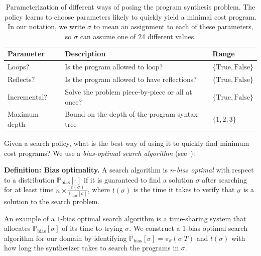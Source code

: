 \documentclass{article}
\newcommand{\probability}{\mathds{P}} %
\begin{document}
\begin{table}[h]\centering
  \caption{Parameterization of different ways of posing the program synthesis problem. The policy learns to choose parameters likely to quickly yield a minimal cost program. In our notation, we write $\sigma $ to mean an assignment to each of these parameters, so $\sigma $ can assume one of 24 different values.}\label{policyOutput}
  \begin{tabular}{lll}\toprule
  Parameter&Description&Range\\\midrule
  Loops?&Is the program allowed to loop?&$\{\text{True},\text{False}\}$\\
  Reflects?&Is the program allowed to have reflections?&$\{\text{True},\text{False}\}$\\
  Incremental?&Solve the problem piece-by-piece or all at once?&$\{\text{True},\text{False}\}$\\
  Maximum depth& Bound on the depth of the program syntax tree&$\{1,2,3\}$
  \\\bottomrule
  \end{tabular}
  \end{table}


Given a search policy, what is the best way of using it to quickly find minimum cost programs?
We use a \emph{bias-optimal search algorithm} (see~\cite{schmidhuber2004optimal}):

\textbf{Definition: Bias optimality.} A search algorithm is $n$-\emph{bias optimal}
with respect to a distribution $\probability_{\text{bias}}[\cdot ]$ if it is
guaranteed to find a solution $\sigma $ after searching for at least time
$n\times\frac{t(\sigma )}{\probability_{\text{bias}}[\sigma ]}$, where $t(\sigma )$ is the time it
takes to verify that $\sigma $ is a solution to the
search problem.

An example of a $1$-bias optimal search algorithm is a time-sharing system
that allocates $\probability_{\text{bias}}[\sigma ]$ of its time to trying $\sigma $.
We construct a $1$-bias optimal search algorithm for our domain by
identifying $\probability_{\text{bias}}[\sigma ] = \pi_\theta(\sigma |T)$
and $t(\sigma )  $ with how long the synthesizer takes to search  the programs in $\sigma $.
\end{document}
